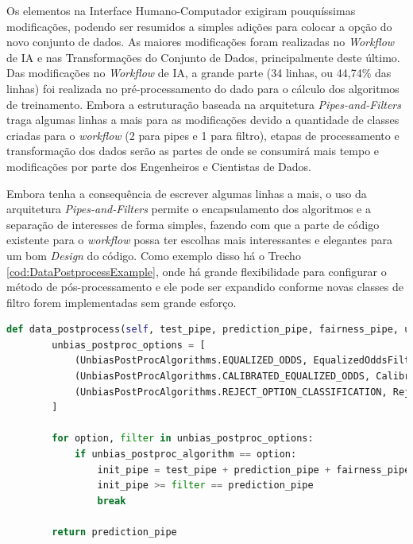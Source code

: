 \documentclass[portugues]{ic-tese}
\begin{document}
Os elementos na Interface Humano-Computador exigiram pouquíssimas modificações, podendo ser resumidos a simples adições para colocar a opção do novo conjunto de dados. As maiores modificações foram realizadas no \textit{Workflow} de IA e nas Transformações do Conjunto de Dados, principalmente deste último. Das modificações no \textit{Workflow} de IA, a grande parte (34 linhas, ou 44,74\% das linhas) foi realizada no pré-processamento do dado para o cálculo dos algoritmos de treinamento. Embora a estruturação baseada na arquitetura \textit{Pipes-and-Filters} traga algumas linhas a mais para as modificações devido a quantidade de classes criadas para o \textit{workflow} (2 para pipes e 1 para filtro), etapas de processamento e transformação dos dados serão as partes de onde se consumirá mais tempo e modificações por parte dos Engenheiros e Cientistas de Dados.

Embora tenha a consequência de escrever algumas linhas a mais, o uso da arquitetura \textit{Pipes-and-Filters} permite o encapsulamento dos algoritmos e a separação de interesses de forma simples, fazendo com que a parte de código existente para o \textit{workflow} possa ter escolhas mais interessantes e elegantes para um bom \textit{Design} do código. Como exemplo disso há o Trecho \ref{cod:DataPostprocessExample}, onde há grande flexibilidade para configurar o método de pós-processamento e ele pode ser expandido conforme novas classes de filtro forem implementadas sem grande esforço.

\begin{lstlisting}[language=Python, caption=Método para escolha do algoritmo com redução de viés no pós-processamento,label=cod:DataPostprocessExample]
    def data_postprocess(self, test_pipe, prediction_pipe, fairness_pipe, unbias_postproc_algorithm):
        unbias_postproc_options = [
            (UnbiasPostProcAlgorithms.EQUALIZED_ODDS, EqualizedOddsFilter()),
            (UnbiasPostProcAlgorithms.CALIBRATED_EQUALIZED_ODDS, CalibratedEqualizedOddsFilter()),
            (UnbiasPostProcAlgorithms.REJECT_OPTION_CLASSIFICATION, RejectOptionClassificationFilter())
        ]

        for option, filter in unbias_postproc_options:
            if unbias_postproc_algorithm == option:
                init_pipe = test_pipe + prediction_pipe + fairness_pipe['unprivileged_group', 'privileged_group']
                init_pipe >= filter == prediction_pipe
                break

        return prediction_pipe
\end{lstlisting}
\end{document}
